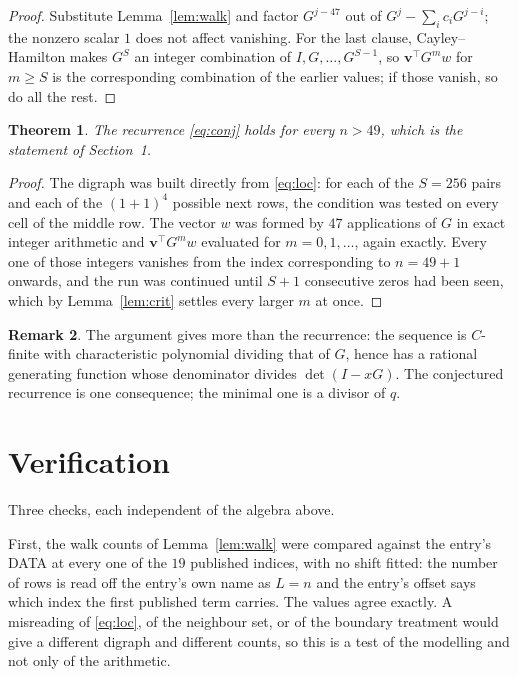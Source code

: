 \documentclass[11pt,a4paper]{article}
\theoremstyle{plain}
\newtheorem{theorem}{Theorem}
\theoremstyle{definition}
\newtheorem{remark}[theorem]{Remark}
\begin{document}
\begin{proof}
Substitute Lemma~\ref{lem:walk} and factor $G^{j-47}$ out of
$G^{j}-\sum_ic_iG^{j-i}$; the nonzero scalar $1$ does not affect
vanishing. For the last clause, Cayley--Hamilton makes $G^{S}$ an integer combination of
$I,G,\dots,G^{S-1}$, so $\mathbf{v}^{\!\top}G^{m}w$ for $m\ge S$ is the corresponding
combination of the earlier values; if those vanish, so do all the rest.
\end{proof}

\begin{theorem}
The recurrence \eqref{eq:conj} holds for every $n>49$, which is the statement of
Section~1.
\end{theorem}

\begin{proof}
The digraph was built directly from \eqref{eq:loc}: for each of the $S=256$ pairs and each
of the $(1+1)^{4}$ possible next rows, the condition was tested on every cell of
the middle row. The vector $w$ was formed by $47$ applications of $G$ in exact integer
arithmetic and $\mathbf{v}^{\!\top}G^{m}w$ evaluated for $m=0,1,\dots$, again exactly.
Every one of those integers vanishes from the index corresponding to $n=49+1$ onwards,
and the run was continued until $S+1$ consecutive zeros had been seen, which by
Lemma~\ref{lem:crit} settles every larger $m$ at once.
\end{proof}

\begin{remark}
The argument gives more than the recurrence: the sequence is $C$-finite with characteristic
polynomial dividing that of $G$, hence has a rational generating function whose denominator
divides $\det(I-xG)$. The conjectured recurrence is one consequence; the minimal one is a
divisor of $q$.
\end{remark}

\section{Verification}

Three checks, each independent of the algebra above.

First, the walk counts of Lemma~\ref{lem:walk} were compared against the entry's DATA at
every one of the $19$ published indices, with no shift fitted: the number of rows is
read off the entry's own name as $L=n$ and the entry's offset says which index the first
published term carries. The values agree exactly. A misreading of \eqref{eq:loc}, of the
neighbour set, or of the boundary treatment would give a different digraph and different
counts, so this is a test of the modelling and not only of the arithmetic.
\end{document}
